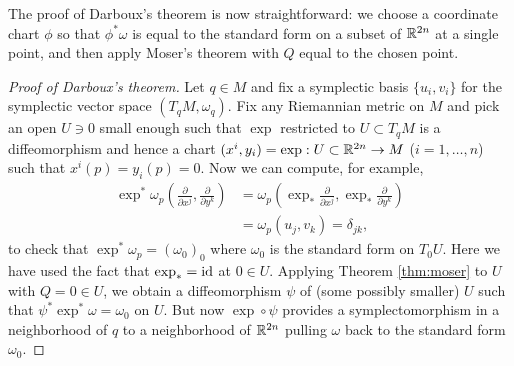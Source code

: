 \documentclass{amsart}
\begin{document}
The proof of Darboux's theorem is now straightforward: we choose a coordinate chart $\phi$ so that
$\phi^*\omega$ is equal to the standard form on a subset of $\mathbb{R}^{2n}$ at a single point, and then
apply Moser's theorem with $Q$ equal to the chosen point.

\begin{proof}[Proof of Darboux's theorem]
    Let $q\in M$ and fix a symplectic basis $\{u_i,v_i\}$ for the symplectic vector space $(T_qM,\omega_q)$.
    Fix any Riemannian metric on $M$ and pick an open $U\ni 0$ small enough such that $\exp$ restricted to
    $U\subset T_qM$ is a diffeomorphism and hence a chart $(x^i,y_i)=\exp:U\subset\mathbb{R}^{2n}\to M$
    ($i=1,\ldots,n$) such that $x^i(p)=y_i(p)=0$. Now we can compute, for example,
    \begin{align*}
        \exp^*\omega_p\left( \frac{\partial}{\partial x^j},\frac{\partial}{\partial y^k} \right) &=\omega_p\left(\exp_*\frac{\partial}{\partial x^j},\exp_*\frac{\partial}{\partial y^k}\right)\\
        &=\omega_p\left( u_j,v_k \right)=\delta_{jk},
    \end{align*}
    to check that $\exp^*\omega_p=(\omega_0)_0$ where $\omega_0$ is the standard form on $T_0U$.
    Here we have used the fact that $\exp_*=\operatorname{id}$ at $0\in U$.
    Applying Theorem \ref{thm:moser} to $U$ with $Q=0\in U$, we obtain a diffeomorphism $\psi$ of
    (some possibly smaller) $U$ such that $\psi^*\exp^*\omega=\omega_0$ on $U$. But now
    $\exp\circ\psi$ provides a symplectomorphism in a neighborhood of $q$ to a neighborhood of $\mathbb{R}^{2n}$
    pulling $\omega$ back to the standard form $\omega_0$.
\end{proof}
\end{document}
